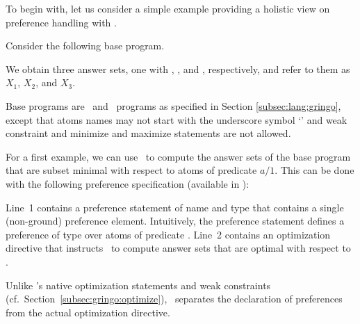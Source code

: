 To begin with,
let us consider a simple example providing a holistic view on preference handling with \asprin.
%
\begin{example}\label{asprin:example1}
Consider the following base program.
%

%
We obtain three answer sets, one with , , and , respectively,
and refer to them as $X_1$, $X_2$, and $X_3$.

\begin{note}
Base programs are \gringo\ and \clingo\ programs as specified in Section \ref{subsec:lang:gringo}, 
except that atoms names may not start with the underscore symbol `' 
and weak constraint and minimize and maximize statements are not allowed.
\end{note}

For a first example,
we can use \asprin\ to compute the answer sets of the base program that are subset minimal with respect to atoms of predicate $a/1$. 
This can be done with the following preference specification 
(available in ): 
%

%
Line~1 contains a preference statement of name  and type  that contains a single (non-ground) preference element.
Intuitively, the preference statement  defines a preference of type  over atoms of predicate . 
Line~2 contains an optimization directive that instructs \asprin\ to compute answer sets that are optimal with respect to . 

\begin{note}\label{asprin:note}
Unlike \gringo's native optimization statements and weak constraints (cf.\ Section~\ref{subsec:gringo:optimize}),
\asprin\ separates the declaration of preferences from the actual optimization directive.
\end{note}


\end{example}
